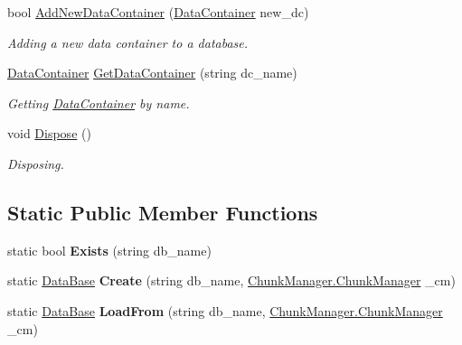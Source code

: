 \begin{DoxyCompactItemize}
\item 
bool \hyperlink{class_dwarf_d_b_1_1_data_structures_1_1_data_base_a251d5fa0ba9b21d911a9a1c5dcf33152}{AddNewDataContainer} (\hyperlink{class_dwarf_d_b_1_1_data_structures_1_1_data_container}{DataContainer} new\_\-dc)
\begin{DoxyCompactList}\small\item\em Adding a new data container to a database. \item\end{DoxyCompactList}\item 
\hyperlink{class_dwarf_d_b_1_1_data_structures_1_1_data_container}{DataContainer} \hyperlink{class_dwarf_d_b_1_1_data_structures_1_1_data_base_aa554e79937460eb937b90d81093019b5}{GetDataContainer} (string dc\_\-name)
\begin{DoxyCompactList}\small\item\em Getting \hyperlink{class_dwarf_d_b_1_1_data_structures_1_1_data_container}{DataContainer} by name. \item\end{DoxyCompactList}\item 
void \hyperlink{class_dwarf_d_b_1_1_data_structures_1_1_data_base_a35fdd80e2d23da47200c8de150a88642}{Dispose} ()
\begin{DoxyCompactList}\small\item\em Disposing. \item\end{DoxyCompactList}\end{DoxyCompactItemize}
\subsection*{Static Public Member Functions}
\begin{DoxyCompactItemize}
\item 
\hypertarget{class_dwarf_d_b_1_1_data_structures_1_1_data_base_a984abdba15e81a2f8e5cd1345986202a}{
static bool {\bfseries Exists} (string db\_\-name)}
\label{class_dwarf_d_b_1_1_data_structures_1_1_data_base_a984abdba15e81a2f8e5cd1345986202a}

\item 
\hypertarget{class_dwarf_d_b_1_1_data_structures_1_1_data_base_ace80fe82a351705958326c8d2a7f03ff}{
static \hyperlink{class_dwarf_d_b_1_1_data_structures_1_1_data_base}{DataBase} {\bfseries Create} (string db\_\-name, \hyperlink{class_dwarf_d_b_1_1_chunk_manager_1_1_chunk_manager}{ChunkManager.ChunkManager} \_\-cm)}
\label{class_dwarf_d_b_1_1_data_structures_1_1_data_base_ace80fe82a351705958326c8d2a7f03ff}

\item 
\hypertarget{class_dwarf_d_b_1_1_data_structures_1_1_data_base_af709d60f64dc5065a95dc678ebc03f30}{
static \hyperlink{class_dwarf_d_b_1_1_data_structures_1_1_data_base}{DataBase} {\bfseries LoadFrom} (string db\_\-name, \hyperlink{class_dwarf_d_b_1_1_chunk_manager_1_1_chunk_manager}{ChunkManager.ChunkManager} \_\-cm)}
\label{class_dwarf_d_b_1_1_data_structures_1_1_data_base_af709d60f64dc5065a95dc678ebc03f30}

\end{DoxyCompactItemize}
